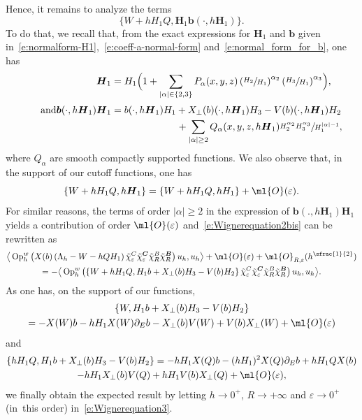 \documentclass[JEP,XML,SOM,Unicode, NoEqCountersInSection,published]{cedram}
\theoremstyle{plain}
\theoremstyle{definition}
\theoremstyle{remark}
\newcommand{\Op}{\operatorname{Op}}
\begin{document}
Hence, it remains to analyze the terms
\[
\bigl\{W+hH_1Q,\boldsymbol{H}_1 \boldsymbol{b}(\cdot,h \boldsymbol{H}_1)\bigr\}.
\]
To do that, we recall that, from the exact expressions for $\boldsymbol{H}_1$ and $\boldsymbol{b}$ given in~\eqref{e:normalform-H1},~\eqref{e:coeff-a-normal-form} and~\eqref{e:normal_form_for_b}, one has
\begin{align*}\textstyle
\boldsymbol{H}_1&=H_1\Bigl(1+\sum_{|\alpha|\in\{2,3\}}P_{\alpha}(x,y,z)\left(\sfrac{H_2}{H_1}\right)^{\alpha_2}\left(\sfrac{H_3}{H_1}\right)^{\alpha_3}\Bigr),
\\[3pt]
\tag*{and}
\boldsymbol{b}(\cdot,h\boldsymbol{H}_1)\boldsymbol{H}_1 & =b(\cdot,h\boldsymbol{H}_1)H_1+X_\perp(b)(\cdot,h\boldsymbol{H}_1)H_3-V(b)(\cdot,h\boldsymbol{H}_1)H_2\\
& \hspace*{2.35cm} +\sum_{|\alpha|\geq 2}Q_{\alpha}(x,y,z,h\boldsymbol{H}_1)\sfrac{H_2^{\alpha_2}H_3^{\alpha_3}}{H_1^{|\alpha|-1}},
\end{align*}
where $Q_\alpha$ are smooth compactly supported functions. We also observe that, in the support of our cutoff functions, one has
\[
\{W+hH_1Q,h\boldsymbol{H}_1\}=\{W+hH_1Q,hH_1\}+\ml{O}(\varepsilon).
\]
For similar reasons, the terms of order $|\alpha|\geq 2$ in the expression of $\boldsymbol{b}(.,h\boldsymbol{H}_1)\boldsymbol{H}_1$ yields a contribution of order $\ml{O}(\varepsilon)$ and~\eqref{e:Wignerequation2bis} can be rewritten as
\begin{multline}\label{e:Wignerequation3}
\big \langle\Op_h^w\left(X(b)\left(\Lambda_h-W-hQH_1\right)\tilde{\chi}_\varepsilon^C\tilde{\chi}_\varepsilon^{\boldsymbol{C}}\tilde{\chi}_R^B\tilde{\chi}_R^{\boldsymbol{B}}\right) u_h,u_h\big\rangle+\ml{O}(\varepsilon)+\ml{O}_{R,\varepsilon}(h^{\sfrac{1}{2}})\\
= -\big \langle\Op_h^w\left(\left\{W+hH_1Q,H_1 b+X_\perp(b)H_3-V(b)H_2\right\}\tilde{\chi}_\varepsilon^C\tilde{\chi}_\varepsilon^{\boldsymbol{C}}\tilde{\chi}_R^B\tilde{\chi}_R^{\boldsymbol{B}}\right) u_h,u_h\big\rangle.
\end{multline}
As one has, on the support of our functions,
\begin{multline*}
\{ W , H_1 b+X_\perp(b)H_3-V(b)H_2 \} \\
= - X(W)b - hH_1 X(W) \partial_Eb-X_\perp(b)V(W)+V(b)X_\perp(W)+\ml{O}(\varepsilon)
\end{multline*}
and
\begin{multline*}
\{ hH_1 Q, H_1 b+X_\perp(b)H_3-V(b)H_2 \}= - hH_1 X(Q) b - (hH_1)^2 X(Q) \partial_Eb + hH_1 Q X(b)\\
 - hH_1X_\perp(b)V(Q)+hH_1V(b)X_\perp(Q)+\ml{O}(\varepsilon),
\end{multline*}
we finally obtain the expected result by letting $h\to 0^+$, $R\to+\infty$ and $\varepsilon\to 0^+$ (in~this order) in~\eqref{e:Wignerequation3}.
\end{document}
